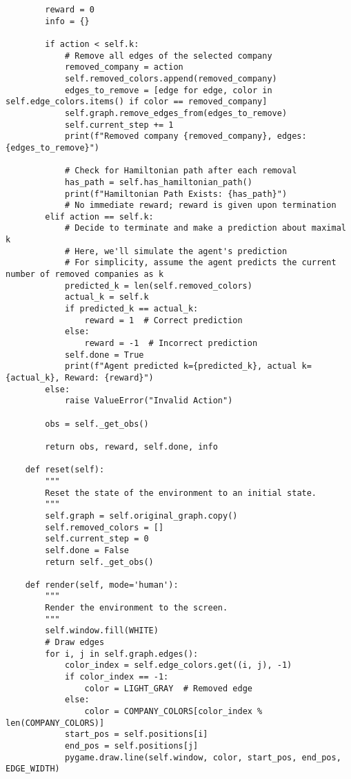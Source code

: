 \begin{lstlisting}
        reward = 0
        info = {}

        if action < self.k:
            # Remove all edges of the selected company
            removed_company = action
            self.removed_colors.append(removed_company)
            edges_to_remove = [edge for edge, color in self.edge_colors.items() if color == removed_company]
            self.graph.remove_edges_from(edges_to_remove)
            self.current_step += 1
            print(f"Removed company {removed_company}, edges: {edges_to_remove}")

            # Check for Hamiltonian path after each removal
            has_path = self.has_hamiltonian_path()
            print(f"Hamiltonian Path Exists: {has_path}")
            # No immediate reward; reward is given upon termination
        elif action == self.k:
            # Decide to terminate and make a prediction about maximal k
            # Here, we'll simulate the agent's prediction
            # For simplicity, assume the agent predicts the current number of removed companies as k
            predicted_k = len(self.removed_colors)
            actual_k = self.k
            if predicted_k == actual_k:
                reward = 1  # Correct prediction
            else:
                reward = -1  # Incorrect prediction
            self.done = True
            print(f"Agent predicted k={predicted_k}, actual k={actual_k}, Reward: {reward}")
        else:
            raise ValueError("Invalid Action")

        obs = self._get_obs()

        return obs, reward, self.done, info

    def reset(self):
        """
        Reset the state of the environment to an initial state.
        """
        self.graph = self.original_graph.copy()
        self.removed_colors = []
        self.current_step = 0
        self.done = False
        return self._get_obs()

    def render(self, mode='human'):
        """
        Render the environment to the screen.
        """
        self.window.fill(WHITE)
        # Draw edges
        for i, j in self.graph.edges():
            color_index = self.edge_colors.get((i, j), -1)
            if color_index == -1:
                color = LIGHT_GRAY  # Removed edge
            else:
                color = COMPANY_COLORS[color_index % len(COMPANY_COLORS)]
            start_pos = self.positions[i]
            end_pos = self.positions[j]
            pygame.draw.line(self.window, color, start_pos, end_pos, EDGE_WIDTH)


\end{lstlisting}

